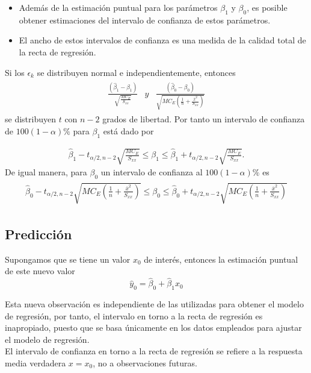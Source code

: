 \begin{itemize}
\item Adem\'as de la estimaci\'on puntual para los par\'ametros $\beta_{1}$ y $\beta_{0}$, es posible obtener estimaciones del intervalo de confianza de estos par\'ametros.

\item El ancho de estos intervalos de confianza es una medida de la calidad total de la recta de regresi\'on.

\end{itemize}

Si los $\epsilon_{k}$ se distribuyen normal e independientemente, entonces
\begin{eqnarray*}
\begin{array}{ccc}
\frac{\left(\hat{\beta}_{1}-\beta_{1}\right)}{\sqrt{\frac{MC_{E}}{S_{xx}}}}&y &\frac{\left(\hat{\beta}_{0}-\beta_{0}\right)}{\sqrt{MC_{E}\left(\frac{1}{n}+\frac{\overline{x}^{2}}{S_{xx}}\right)}}
\end{array}
\end{eqnarray*}
se distribuyen $t$ con $n-2$ grados de libertad. Por tanto un intervalo de confianza de $100\left(1-\alpha\right)\%$ para $\beta_{1}$ est\'a dado por




\begin{eqnarray}
\hat{\beta}_{1}-t_{\alpha/2,n-2}\sqrt{\frac{MC_{E}}{S_{xx}}}\leq \beta_{1}\leq\hat{\beta}_{1}+t_{\alpha/2,n-2}\sqrt{\frac{MC_{E}}{S_{xx}}}.
\end{eqnarray}
De igual manera, para $\beta_{0}$ un intervalo de confianza al $100\left(1-\alpha\right)\%$ es
\small{
\begin{eqnarray}
\begin{array}{l}
\hat{\beta}_{0}-t_{\alpha/2,n-2}\sqrt{MC_{E}\left(\frac{1}{n}+\frac{\overline{x}^{2}}{S_{xx}}\right)}\leq\beta_{0}\leq\hat{\beta}_{0}+t_{\alpha/2,n-2}\sqrt{MC_{E}\left(\frac{1}{n}+\frac{\overline{x}^{2}}{S_{xx}}\right)}
\end{array}
\end{eqnarray}}


%
\subsection{Predicci\'on}


Supongamos que se tiene un valor $x_{0}$ de inter\'es, entonces la estimaci\'on puntual de este nuevo valor
\begin{equation}
\hat{y}_{0}=\hat{\beta}_{0}+\hat{\beta}_{1}x_{0}
\end{equation}
\begin{Note}
Esta nueva observaci\'on es independiente de las utilizadas para obtener el modelo de regresi\'on, por tanto, el intervalo en torno a la recta de regresi\'on es inapropiado, puesto que se basa \'unicamente en los datos empleados para ajustar el modelo de regresi\'on.\\

El intervalo de confianza en torno a la recta de regresi\'on se refiere a la respuesta media verdadera $x=x_{0}$, no a observaciones futuras.
\end{Note}






